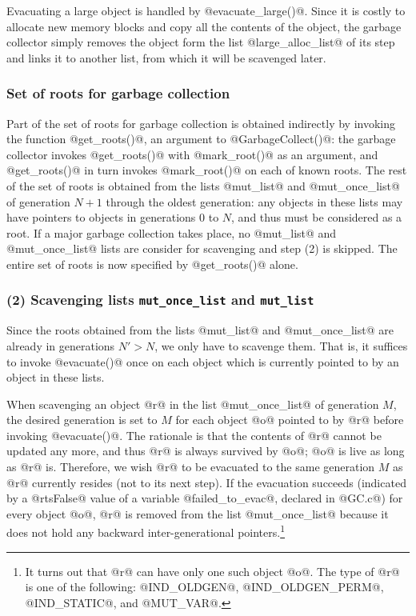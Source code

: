 \documentclass{article}
\begin{document}
Evacuating a large object is handled by @evacuate_large()@.  
Since it is costly to allocate new memory blocks and copy all the contents
of the object, the garbage collector simply removes the object form
the list @large_alloc_list@ of its step and links it to another list,
from which it will be scavenged later.

\subsubsection{Set of roots for garbage collection}
Part of the set of roots for garbage collection is obtained indirectly by 
invoking the function
@get_roots()@, an argument to @GarbageCollect()@: the garbage collector
invokes @get_roots()@ with @mark_root()@ as an argument, and @get_roots()@
in turn invokes @mark_root()@ on each of known roots.
The rest of the set of roots is obtained from the lists @mut_list@ and
@mut_once_list@ of generation $N + 1$ through the oldest generation:
any objects in these lists may have pointers to objects in generations
$0$ to $N$, and thus must be considered as a root.
If a major garbage collection takes place, no @mut_list@ and @mut_once_list@
lists are consider for scavenging and step (2) is skipped.
The entire set of roots is now specified by @get_roots()@ alone.

\subsubsection{(2) Scavenging lists {\tt mut\_once\_list} and {\tt mut\_list}}

Since the roots obtained from the lists @mut_list@ and @mut_once_list@ are
already in generations $N' > N$, we only have to scavenge them.
That is, it suffices to invoke @evacuate()@ once on each object 
which is currently pointed to by an object in these lists. 

When scavenging an object @r@ in the list @mut_once_list@ of generation $M$,
the desired generation is set to $M$ for each object @o@ pointed
to by @r@ before invoking @evacuate()@. 
The rationale is that the contents of @r@ cannot be updated any more,
and thus @r@ is always survived by @o@; @o@ is live as long as @r@ is.
Therefore, we wish @r@ to be evacuated to the same generation $M$ as @r@
currently resides (not to its next step).
If the evacuation succeeds (indicated by a @rtsFalse@ value of a variable
@failed_to_evac@, declared in @GC.c@) for every object @o@, @r@ is removed 
from the list @mut_once_list@ because it does not hold any backward 
inter-generational pointers.\footnote{It turns out that @r@ can have only
one such object @o@. The type of @r@ is one of the following:
@IND\_OLDGEN@, @IND\_OLDGEN\_PERM@, @IND\_STATIC@, and @MUT\_VAR@.}
\end{document}
